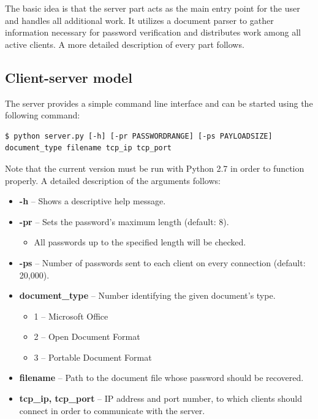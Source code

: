 \documentclass[11pt,oneside]{fithesis2}
\begin{document}
The basic idea is that the server part acts as the main entry point for the user and handles all additional work. It utilizes a document parser to gather information necessary for password verification and distributes work among all active clients. A more detailed description of every part follows. 

\subsection{Client-server model}\label{client-server}

The server provides a simple command line interface and can be started using the following command: 

\begin{lstlisting}
$ python server.py [-h] [-pr PASSWORDRANGE] [-ps PAYLOADSIZE] document_type filename tcp_ip tcp_port
\end{lstlisting}

Note that the current version must be run with Python 2.7 in order to function properly. A detailed description of the arguments follows:

\begin{itemize}
\setlength\itemsep{0.1em}
	\item{\textbf{-h} -- Shows a descriptive help message.}
	\item{\textbf{-pr} -- Sets the password's maximum length (default: 8).}
		\begin{itemize}
		\setlength\itemsep{0.1em}
			\item{All passwords up to the specified length will be checked.}
		\end{itemize}
	\item{\textbf{-ps} -- Number of passwords sent to each client on every connection (default: 20,000).}
	\item{\textbf{document\_type} -- Number identifying the given document's type.}
		\begin{itemize}
		\setlength\itemsep{0.1em}
			\item{1 -- Microsoft Office}
			\item{2 -- Open Document Format}
			\item{3 -- Portable Document Format}
		\end{itemize}
	\item{\textbf{filename} -- Path to the document file whose password should be recovered.}
	\item{\textbf{tcp\_ip, tcp\_port} --  IP address and port number, to which clients should connect in order to communicate with the server.}
\end{itemize}\label{server_params}
\end{document}
